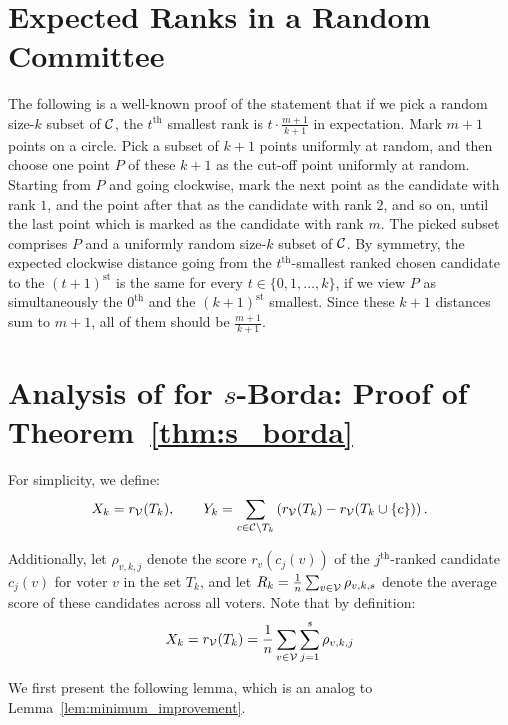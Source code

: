 \section{Expected Ranks in a Random Committee}
\label{app:folklore}
The following is a well-known proof of the statement that if we pick a random size-$k$ subset of $\mathcal{C}$, the $t^{\text{th}}$ smallest rank is $t \cdot \frac{m + 1}{k + 1}$ in expectation. Mark $m + 1$ points on a circle. Pick a subset of $k + 1$ points uniformly at random, and then choose one point $P$ of these $k + 1$ as the cut-off point uniformly at random. Starting from $P$ and going clockwise, mark the next point as the candidate with rank $1$, and the point after that as the candidate with rank $2$, and so on, until the last point which is marked as the candidate with rank $m$. The picked subset comprises $P$ and a uniformly random size-$k$ subset of $\mathcal{C}$. By symmetry, the expected clockwise distance going from the $t^{\text{th}}$-smallest ranked chosen candidate to the $(t + 1)^{\text{st}}$ is the same for every $t \in \{0, 1, \ldots, k\}$, if we view $P$ as simultaneously the $0^{\text{th}}$ and the $(k + 1)^{\text{st}}$ smallest. Since these $k + 1$ distances sum to $m + 1$, all of them should be $\frac{m + 1}{k + 1}$.

\section{Analysis of \g{} for $s$-Borda: Proof of Theorem~\ref{thm:s_borda}}
\label{app:sborda}
For simplicity, we define:
\[
X_k = r_{\mathcal{V}}(T_{k}),\qquad Y_k = \sum_{c \in \mathcal{C} \setminus T_k}\left(r_{\mathcal{V}}(T_k) - r_{\mathcal{V}}(T_k \cup \{c\})\right).
\]

Additionally, let $\rho_{v, k, j} $ denote the score $r_v(c_j(v))$ of the $j^{\text{th}}$-ranked candidate $c_j(v)$ for voter $v$ in the set $T_k$, and let $R_{k} = \frac{1}{n}\sum_{v \in \mathcal{V}} \rho_{v, k, s}$ denote the average score of these candidates across all voters. Note that by definition:
\begin{equation}
\label{eq:xk}
    X_k = r_{\mathcal{V}}(T_k) = \frac{1}{n} \sum_{v \in \mathcal{V}} \sum_{j=1}^s \rho_{v,k,j}
\end{equation}

We first present the following lemma, which is an analog to Lemma~\ref{lem:minimum_improvement}.

